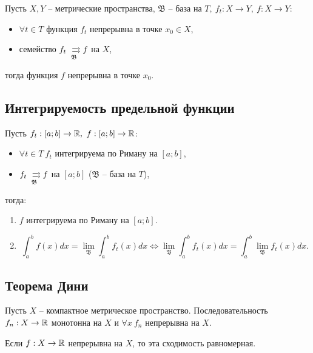 \begin{theorem}
    Пусть $ X,Y $ -- метрические пространства, $ \mathfrak{B} $ -- база на $ T, \ f_t: X \rightarrow Y, \ f: X \rightarrow Y $:
    \begin{itemize}
        \item $ \forall t \in T $ функция $ f_t $ непрерывна в точке $ x_0 \in X $,
        \item семейство $ f_t \xrightrightarrows[\mathfrak{B}]{} f $ на $ X $,
    \end{itemize}
    тогда функция $ f $ непрерывна в точке $ x_0 $.
\end{theorem}

\subsection{Интегрируемость предельной функции}

\begin{theorem}\label{theorem:6.9.2}
    Пусть $ f_t: [a;b] \rightarrow \mathbb{R}, \ f: [a;b] \rightarrow \mathbb{R} $:
    \begin{itemize}
        \item $ \forall t \in T \ f_t $ интегрируема по Риману на $ [a;b] $,
        \item $ f_t \xrightrightarrows[\mathfrak{B}]{} f $ на $ [a;b] $ ($ \mathfrak{B} $ -- база на $ T $),
    \end{itemize}
    тогда:
    \begin{enumerate}
        \item $ f $ интегрируема по Риману на $ [a;b] $.
        \item \[
                  \int_{a}^{b}f(x)dx = \underset{\mathfrak{B}}{\lim}\int_{a}^{b}f_t(x)dx \iff \underset{\mathfrak{B}}{\lim}\int_{a}^{b}f_t(x)dx = \int_{a}^{b}\underset{\mathfrak{B}}{\lim}f_t(x)dx.
              \]
    \end{enumerate}
\end{theorem}

\subsection{Теорема Дини}

\begin{theorem}
    Пусть $ X $ -- компактное метрическое пространство. Последовательность $ f_n: X \rightarrow\mathbb{R} $ монотонна на $ X $ и $ \forall x \ f_n $ непрерывна на $ X $.

    Если $ f: X \rightarrow \mathbb{R} $ непрерывна на $ X $, то эта сходимость равномерная.
\end{theorem}

